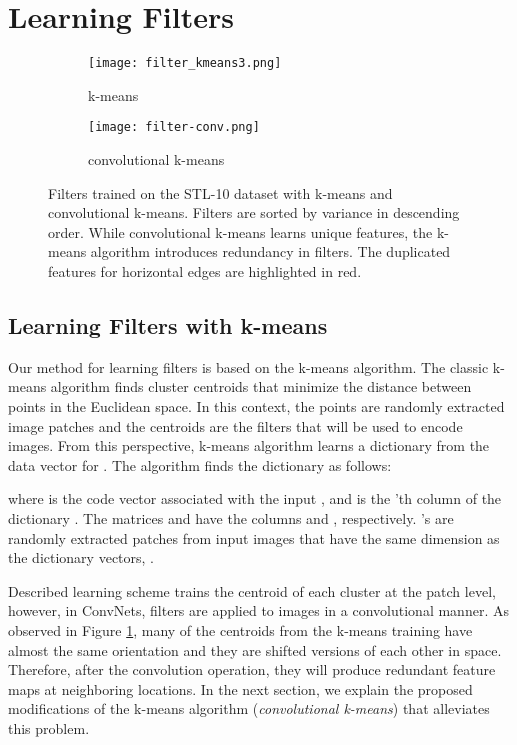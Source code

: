 \documentclass{article} \usepackage{iclr2016_workshop,times}
\begin{document}
\section{Learning Filters}
\label{sec:kmeans}
\begin{figure*}
  \centering
  \begin{subfigure}[b]{0.5\textwidth}
    \centering
    \texttt{[image: filter\_kmeans3.png]}
    \caption{ k-means}
    \label{fig:filters-kmeans}
  \end{subfigure}\begin{subfigure}[b]{0.5\textwidth}
      \centering
    \texttt{[image: filter-conv.png]}
    \caption{convolutional k-means}
    \label{fig:filters-conv}
  \end{subfigure}
  \caption{Filters trained on the STL-10 dataset with k-means and convolutional k-means.
  Filters are sorted by variance in descending order. While convolutional k-means learns unique features, the k-means algorithm introduces redundancy in filters.
  The duplicated features for horizontal edges are highlighted in red.}
  \label{fig:filters}
\end{figure*}

\subsection{Learning Filters with k-means}


Our method for learning filters is based on the k-means algorithm.
The classic k-means algorithm finds cluster centroids that minimize the distance between points in the Euclidean space. In this context, the points are randomly extracted image patches and the centroids are the filters that will be used to encode images. From this perspective, k-means algorithm learns a dictionary  from the data vector  for .
The algorithm finds the dictionary as follows:


where  is the code vector associated with the input , and  is the 'th column of the dictionary . The matrices  and  have the columns  and , respectively.
's are randomly extracted patches from input images that have the same dimension as the dictionary vectors, . 

Described learning scheme trains the centroid of each cluster at the patch level, however, in ConvNets, filters are applied to images in a convolutional manner.
As observed in Figure \ref{fig:filters-kmeans}, many of the centroids from the k-means training have almost the same orientation and they are shifted  versions of each other in space. Therefore, after the convolution operation, they will produce redundant feature maps at neighboring locations.
In the next section, we explain the proposed modifications of the k-means algorithm (\textit{convolutional k-means}) that alleviates this problem.
\end{document}
